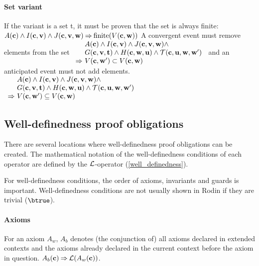 \paragraph{Set variant}
\label{set_variant}
  If the variant is a set t, it must be proven that the set is always finite:
%
  {$A(\mathbf{c}) \land I(\mathbf{c},\mathbf{v}) \land J(\mathbf{c},\mathbf{v},\mathbf{w}) \mathbin\Rightarrow \mathrm{finite}(V(\mathbf{c},\mathbf{w}))$}
A convergent event must remove elements from the set
%
  {$\begin{array}{r@{\ }l}
      & \axioms \land \absinvariants \land \concinvariants \land \\
      & \absguards \land \concguards \land \bapred \\
      \limp & V(\allconstants,\concvariables')\subset V(\allconstants,\concvariables)
    \end{array}$}
and an anticipated event must not add elements.
%
  {$\begin{array}{r@{\ }l}
      & \axioms \land \absinvariants \land \concinvariants \land \\
      & \absguards \land \concguards \land \bapred \\
      \limp & V(\allconstants,\concvariables')\subseteq V(\allconstants,\concvariables)
    \end{array}$}

\subsection{Well-definedness proof obligations}
\label{well_definedness_proof_obligations}
There are several locations where well-definedness proof obligations can be created.
The mathematical notation of the well-definedness conditions
of each operator are defined by the $\mathcal{L}$-operator (\ref{well_definedness}).

For well-definedness conditions, the order of axioms, invariants and guards is important.
Well-definedness conditions are not usually shown in Rodin if they are trivial ($\btrue$).

\paragraph{Axioms}
\label{well_definedness_of_axioms}
For an axiom $A_w$, $A_b$ denotes (the conjunction of) all axioms declared
  in extended contexts and the axioms already declared in
  the current context before the axiom in question.
%
  {$A_b(\mathbf{c}) \mathbin\Rightarrow \mathcal{L}(A_w(\mathbf{c}))$}.

